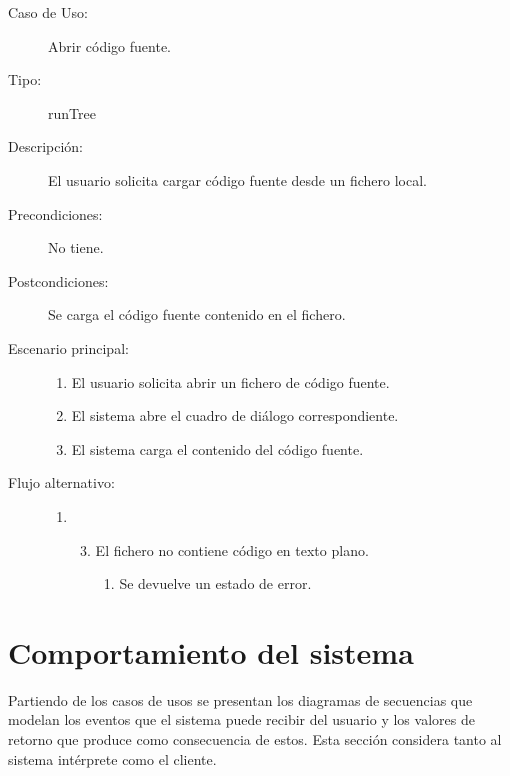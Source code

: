 \begin{description}
   \item[Caso de Uso:] Abrir código fuente.
   \item [Tipo:] runTree
   \item[Descripción:] 
   El usuario solicita cargar código fuente desde un fichero local.
   \item[Precondiciones:]
   No tiene.
   \item[Postcondiciones:] 
   Se carga el código fuente contenido en el fichero.
   \item[Escenario principal:] \hfill
   \begin{enumerate}
   \item El usuario solicita abrir un fichero de código fuente.
   \item El sistema abre el cuadro de diálogo correspondiente.
   \item El sistema carga el contenido del código fuente.
   \end{enumerate}
    \item[Flujo alternativo:] \hfill 
   \begin{enumerate} \itemsep1pt \parskip0pt 
   \setcounter{enumi}{1}
   \renewcommand{\labelenumi}{}
   \renewcommand{\labelenumiii}{\arabic{enumiii}.}
   \renewcommand{\labelenumii}{\arabic{enumi}\alph{enumii}.}
      \item 
      \begin {enumerate}
         \setcounter{enumii}{2}
         \item El fichero no contiene código en texto plano.
         \begin{enumerate}
         \item Se devuelve un estado de error.
         \end{enumerate}
      \end{enumerate}
   \end{enumerate}
\end{description}



\section{Comportamiento del sistema}
Partiendo de los casos de usos se presentan los diagramas de secuencias que modelan 
los eventos que el sistema puede recibir del usuario y los valores de retorno
que produce como consecuencia de estos.  Esta sección considera tanto al sistema intérprete
como el cliente.


